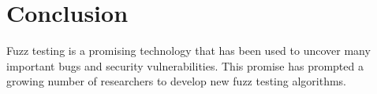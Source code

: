 \chapter{Conclusion}
\label{sec:conclusion}
\vspace*{0.25cm}

Fuzz testing is a promising technology that has been used to uncover
many important bugs and security vulnerabilities. This promise
has prompted a growing number of researchers to develop new
fuzz testing algorithms. 

